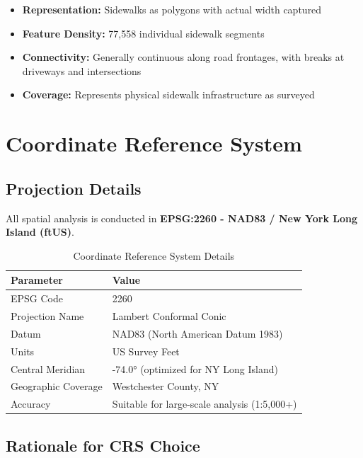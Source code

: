 \documentclass[11pt,letterpaper]{article}
\begin{document}
\begin{itemize}
    \item \textbf{Representation:} Sidewalks as polygons with actual width captured
    \item \textbf{Feature Density:} 77,558 individual sidewalk segments
    \item \textbf{Connectivity:} Generally continuous along road frontages, with breaks at driveways and intersections
    \item \textbf{Coverage:} Represents physical sidewalk infrastructure as surveyed
\end{itemize}

\section{Coordinate Reference System}

\subsection{Projection Details}

All spatial analysis is conducted in \textbf{EPSG:2260 - NAD83 / New York Long Island (ftUS)}.

\begin{table}[H]
\centering
\begin{tabular}{ll}
\toprule
\textbf{Parameter} & \textbf{Value} \\
\midrule
EPSG Code & 2260 \\
Projection Name & Lambert Conformal Conic \\
Datum & NAD83 (North American Datum 1983) \\
Units & US Survey Feet \\
Central Meridian & -74.0° (optimized for NY Long Island) \\
Geographic Coverage & Westchester County, NY \\
Accuracy & Suitable for large-scale analysis (1:5,000+) \\
\bottomrule
\end{tabular}
\caption{Coordinate Reference System Details}
\label{tab:crs}
\end{table}

\subsection{Rationale for CRS Choice}
\end{document}

